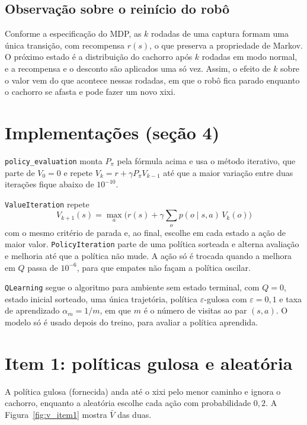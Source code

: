 \documentclass[11pt,a4paper]{article}
\newcommand{\Vbar}{\bar{V}}
\newcommand{\code}[1]{\texttt{#1}}
\begin{document}
\subsection*{Observação sobre o reinício do robô}

Conforme a especificação do MDP, as $k$ rodadas de uma captura formam uma única transição, com recompensa $r(s)$, o que preserva a propriedade de Markov. O próximo estado é a distribuição do cachorro após $k$ rodadas em modo normal, e a recompensa e o desconto são aplicados uma só vez. Assim, o efeito de $k$ sobre o valor vem do que acontece nessas rodadas, em que o robô fica parado enquanto o cachorro se afasta e pode fazer um novo xixi.

\section{Implementações (seção 4)}

\code{policy\_evaluation} monta $P_\pi$ pela fórmula acima e usa o método iterativo, que parte de $V_0 = 0$ e repete $V_k = r + \gamma P_\pi V_{k-1}$ até que a maior variação entre duas iterações fique abaixo de $10^{-10}$.

\code{ValueIteration} repete
\[
V_{k+1}(s) = \max_a \Big( r(s) + \gamma \sum_o p(o \mid s, a)\, V_k(o) \Big)
\]
com o mesmo critério de parada e, ao final, escolhe em cada estado a ação de maior valor. \code{PolicyIteration} parte de uma política sorteada e alterna avaliação e melhoria até que a política não mude. A ação só é trocada quando a melhora em $Q$ passa de $10^{-6}$, para que empates não façam a política oscilar.

\code{QLearning} segue o algoritmo para ambiente sem estado terminal, com $Q = 0$, estado inicial sorteado, uma única trajetória, política $\varepsilon$-gulosa com $\varepsilon = 0{,}1$ e taxa de aprendizado $\alpha_m = 1/m$, em que $m$ é o número de visitas ao par $(s, a)$. O modelo só é usado depois do treino, para avaliar a política aprendida.

\section{Item 1: políticas gulosa e aleatória}

A política gulosa (fornecida) anda até o xixi pelo menor caminho e ignora o cachorro, enquanto a aleatória escolhe cada ação com probabilidade $0{,}2$. A Figura~\ref{fig:v_item1} mostra $\Vbar$ das duas.
\end{document}
